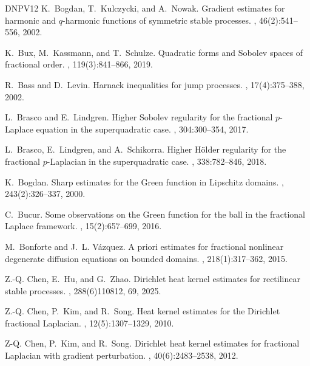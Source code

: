 \documentclass[11pt,reqno]{amsart}
\theoremstyle{plain}
\theoremstyle{definition}
\numberwithin{equation}{section}
\newcommand{\1}{\mathbbm{1}}
\begin{document}
\begin{thebibliography}{DNPV12}
K.~Bogdan, T.~Kulczycki, and A.~Nowak.
\newblock Gradient estimates for harmonic and {$q$}-harmonic functions of
  symmetric stable processes.
, 46(2):541--556, 2002.

K.~Bux, M.~Kassmann, and T.~Schulze.
\newblock Quadratic forms and {S}obolev spaces of fractional order.
, 119(3):841--866, 2019.

R.~Bass and D.~Levin.
\newblock Harnack inequalities for jump processes.
, 17(4):375--388, 2002.

L.~Brasco and E.~Lindgren.
\newblock Higher {S}obolev regularity for the fractional {$p$}-{L}aplace
  equation in the superquadratic case.
, 304:300--354, 2017.

L.~Brasco, E.~Lindgren, and A.~Schikorra.
\newblock Higher {H}\"older regularity for the fractional {$p$}-{L}aplacian in
  the superquadratic case.
, 338:782--846, 2018.

K.~Bogdan.
\newblock Sharp estimates for the {G}reen function in {L}ipschitz domains.
, 243(2):326--337, 2000.

C.~Bucur.
\newblock Some observations on the {G}reen function for the ball in the
  fractional {L}aplace framework.
, 15(2):657--699, 2016.

M.~Bonforte and J.~L. V\'azquez.
\newblock A priori estimates for fractional nonlinear degenerate diffusion
  equations on bounded domains.
, 218(1):317--362, 2015.

Z.-Q. Chen, E.~Hu, and G.~Zhao.
\newblock Dirichlet heat kernel estimates for rectilinear stable processes.
, 288(6)110812, 69, 2025.

Z.-Q. Chen, P.~Kim, and R.~Song.
\newblock Heat kernel estimates for the {D}irichlet fractional {L}aplacian.
, 12(5):1307--1329, 2010.

Z-Q. Chen, P.~Kim, and R.~Song.
\newblock Dirichlet heat kernel estimates for fractional {L}aplacian with
  gradient perturbation.
, 40(6):2483--2538, 2012.


\end{thebibliography}
\end{document}
